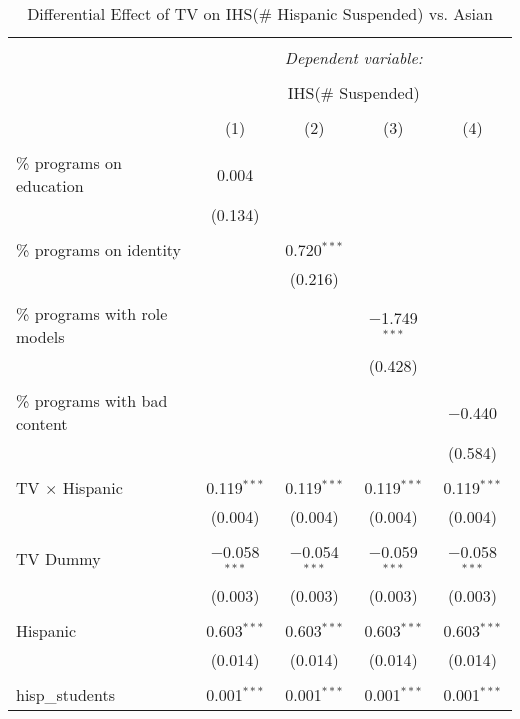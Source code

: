 
\begin{table}[!htbp] \centering 
  \caption{Differential Effect of TV on IHS(\# Hispanic Suspended) vs. Asian} 
  \label{} 
\begin{tabular}{@{\extracolsep{-2pt}}lcccc} 
\\[-1.8ex]\hline 
\hline \\[-1.8ex] 
 & \multicolumn{4}{c}{\textit{Dependent variable:}} \\ 
\cline{2-5} 
\\[-1.8ex] & \multicolumn{4}{c}{IHS(\# Suspended)} \\ 
\\[-1.8ex] & (1) & (2) & (3) & (4)\\ 
\hline \\[-1.8ex] 
 \% programs on education & 0.004 &  &  &  \\ 
  & (0.134) &  &  &  \\ 
  & & & & \\ 
 \% programs on identity &  & 0.720$^{***}$ &  &  \\ 
  &  & (0.216) &  &  \\ 
  & & & & \\ 
 \% programs with role models &  &  & $-$1.749$^{***}$ &  \\ 
  &  &  & (0.428) &  \\ 
  & & & & \\ 
 \% programs with bad content &  &  &  & $-$0.440 \\ 
  &  &  &  & (0.584) \\ 
  & & & & \\ 
 TV $\times$ Hispanic & 0.119$^{***}$ & 0.119$^{***}$ & 0.119$^{***}$ & 0.119$^{***}$ \\ 
  & (0.004) & (0.004) & (0.004) & (0.004) \\ 
  & & & & \\ 
 TV Dummy & $-$0.058$^{***}$ & $-$0.054$^{***}$ & $-$0.059$^{***}$ & $-$0.058$^{***}$ \\ 
  & (0.003) & (0.003) & (0.003) & (0.003) \\ 
  & & & & \\ 
 Hispanic & 0.603$^{***}$ & 0.603$^{***}$ & 0.603$^{***}$ & 0.603$^{***}$ \\ 
  & (0.014) & (0.014) & (0.014) & (0.014) \\ 
  & & & & \\ 
 hisp\_students & 0.001$^{***}$ & 0.001$^{***}$ & 0.001$^{***}$ & 0.001$^{***}$ \\ 

\end{tabular}
\end{table}
